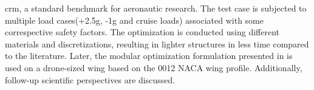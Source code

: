 \gls{crm}, a standard benchmark for aeronautic research. The test case is subjected to multiple load cases(+2.5g, -1g and cruise loads) associated with some correspective safety factors. The optimization is conducted using different materials and discretizations, resulting in lighter structures in less time compared to the literature. Later, the modular optimization formulation presented in  is used on a drone-sized wing based on the 0012 NACA wing profile. Additionally, follow-up scientific perspectives are discussed.